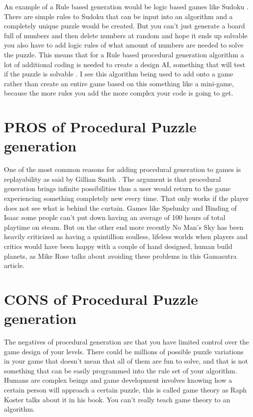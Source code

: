 \documentclass{scrartcl}
\begin{document}
An example of a Rule based generation would be logic based games like Sudoku \cite{browne2013metrics}. There are simple rules to Sudoku that can be input into an algorithm and a completely unique puzzle would be created. But you can’t just generate a board full of numbers and then delete numbers at random and hope it ends up solvable you also have to add logic rules of what amount of numbers are needed to solve the puzzle. This means that for a Rule based procedural generation algorithm a lot of additional coding is needed to create a design AI, something that will test if the puzzle is solvable  \cite{smith2012case}. I see this algorithm being used to add onto a game rather than create an entire game based on this something like a mini-game, because the more rules you add the more complex your code is going to get.

\section{PROS of Procedural Puzzle generation}

One of the most common reasons for adding procedural generation to games is replayability as said by Gillian Smith \cite{smith2014understanding}. The argument is that procedural generation brings infinite possibilities thus a user would return to the game experiencing something completely new every time. That only works if the player does not see what is behind the curtain. Games like Spelunky and Binding of Isaac some people can't put down having an average of 100 hours of total playtime on steam\cite{boiplaytime}. But on the other end more recently No Man's Sky has been heavily criticized as having a quintillion  soulless, lifeless worlds when players and critics would have been happy with a couple of hand designed, human build planets, as Mike Rose talks about avoiding these problems in this Gamasutra article\cite{pcgpros}.

\section{CONS of Procedural Puzzle generation}

The negatives of procedural generation are that you have limited control over the game design of your levels. There could be millions of possible puzzle variations in your game that doesn't mean that all of them are fun to solve, and that is not something that can be easily programmed into the rule set of your algorithm. Humans are complex beings and game development involves knowing how a certain person will approach a certain puzzle, this is called game theory as Raph Koster talks about it in his book\cite{koster2013theory}. You can't really teach game theory to an algorithm.
\end{document}
